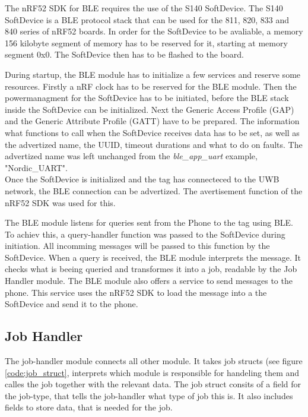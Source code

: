 The nRF52 SDK for BLE requires the use of the S140 SoftDevice.
The S140 SoftDevice is a BLE protocol stack that can be used for the 811, 820, 833 and 840 series of nRF52 boards.
In order for the SoftDevice to be avaliable, a memory 156 kilobyte segment of memory has to be reserved for it, starting at  memory segment 0x0.
The SoftDevice then has to be flashed to the board.

During startup, the BLE module has to initialize a few services and reserve some resources.
Firstly a nRF clock has to be reserved for the BLE module.
Then the powermanagment for the SoftDevice has to be initiated, before the BLE stack inside the SoftDevice can be initialized.
Next the Generic Access Profile (GAP) and the Generic Attribute Profile (GATT) have to be prepared.
The information what functions to call when the SoftDevice receives data has to be set, as well as the advertized name, the UUID, timeout durations and what to do on faults.
The advertized name was left unchanged from the \textit{ble{\_}app{\_}uart} example, "Nordic{\_}UART".\\
Once the SoftDevice is initialized and the tag has connecteced to the UWB network, the BLE connection can be advertized.
The avertisement function of the nRF52 SDK was used for this.


The BLE module listens for queries sent from the Phone to the tag using BLE.
To achiev this, a query-handler function was passed to the SoftDevice during initiation.
All incomming messages will be passed to this function by the SoftDevice.
When a query is received, the BLE module interprets the message.
It checks what is beeing queried and transformes it into a job, readable by the Job Handler module.
The BLE module also offers a service to send messages to the phone.
This service uses the nRF52 SDK to load the message into a the SoftDevice and send it to the phone.


\subsection{Job Handler}
\label{ss:job_handler_module}

The job-handler module connects all other module.
It takes job structs (see figure \ref{code:job_struct}, interprets which module is responsible for handeling them and calles the job together with the relevant data.
The job struct consits of a field for the job-type, that tells the job-handler what type of job this is. It also includes fields to store data, that is needed for the job.

